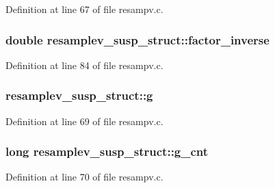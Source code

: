 Definition at line 67 of file resampv.\+c.

\subsubsection[{\texorpdfstring{factor\+\_\+inverse}{factor_inverse}}]{\setlength{\rightskip}{0pt plus 5cm}double resamplev\+\_\+susp\+\_\+struct\+::factor\+\_\+inverse}\hypertarget{structresamplev__susp__struct_aef32f4ef95a51e6d9d1d8118392f0ed9}{}\label{structresamplev__susp__struct_aef32f4ef95a51e6d9d1d8118392f0ed9}


Definition at line 84 of file resampv.\+c.

\subsubsection[{\texorpdfstring{g}{g}}]{ resamplev\+\_\+susp\+\_\+struct\+::g}\hypertarget{structresamplev__susp__struct_a75da938aec1d9ed1a74115718394eb17}{}\label{structresamplev__susp__struct_a75da938aec1d9ed1a74115718394eb17}


Definition at line 69 of file resampv.\+c.

\subsubsection[{\texorpdfstring{g\+\_\+cnt}{g_cnt}}]{\setlength{\rightskip}{0pt plus 5cm}long resamplev\+\_\+susp\+\_\+struct\+::g\+\_\+cnt}\hypertarget{structresamplev__susp__struct_aaf8bdb30ef64710c84ab87dce5e4df1c}{}\label{structresamplev__susp__struct_aaf8bdb30ef64710c84ab87dce5e4df1c}


Definition at line 70 of file resampv.\+c.

